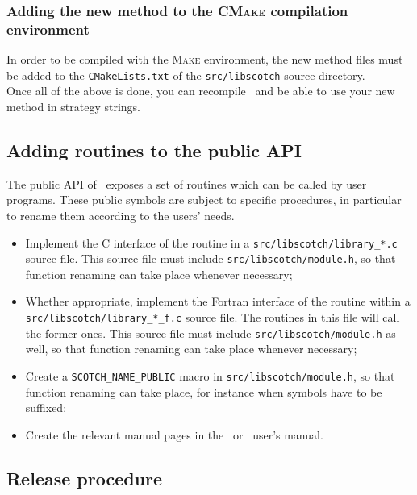 \subsubsection{Adding the new method to the \textsc{CMake} compilation environment}

In order to be compiled with the \textsc{Make} environment, the new
method files must be added to the \texttt{CMakeLists.txt} of the
\texttt{src/\lbt libscotch} source directory.
\\

Once all of the above is done, you can recompile \scotch\ and be able
to use your new method in strategy strings.

\subsection{Adding routines to the public API}
\label{sec-routine}

The public API of \scotch\ exposes a set of routines which can be
called by user programs. These public symbols are subject to specific
procedures, in particular to rename them according to the users'
needs.
\begin{itemize}
\item
Implement the C interface of the routine in a
\texttt{src/\lbt libscotch/\lbt library\_*.c} source file. This source
file must include \texttt{src/\lbt libscotch/\lbt module.h}\enspace,
so that function renaming can take place whenever necessary;
\item
Whether appropriate, implement the Fortran interface of the routine
within a \texttt{src/\lbt libscotch/\lbt library\_*\_f.c} source
file. The routines in this file will call the former ones. This source
file must include \texttt{src/\lbt libscotch/\lbt module.h} as well,
so that function renaming can take place whenever necessary;
\item
Create a \texttt{SCOTCH\_\lbt NAME\_\lbt PUBLIC} macro in
\texttt{src/\lbt libscotch/\lbt module.h}\enspace, so that function
renaming can take place, for instance when symbols have to be
suffixed;
\item
Create the relevant manual pages in the \scotch\ or \ptscotch\ user's
manual.
\end{itemize}

\subsection{Release procedure}
\label{sec-data}

